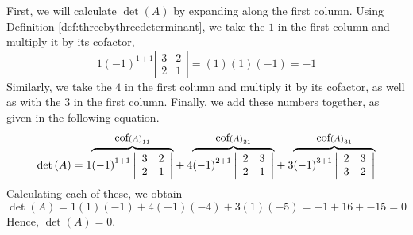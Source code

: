 \begin{solution} First, we will calculate $\det \left(A\right)$ by expanding along the first column.
Using Definition \ref{def:threebythreedeterminant}, we take the $1$ in the first column and multiply it 
by its cofactor,
\begin{equation*}
1  \left( -1\right) ^{1+1}\left|
\begin{array}{rr}
3 & 2 \\
2 & 1
\end{array}
\right| 
=
(1)(1)(-1) = -1 
\end{equation*}
Similarly, we take the $4$ in the first column and multiply it by its cofactor, 
as well as with the $3$ in the first column. Finally, we add these numbers together, as given in the following
equation.
\begin{equation*}
\det \left(A\right) = 
1 \overset{
\mbox{cof}\left( A\right) _{11}}{\overbrace{\left( -1\right) ^{1+1}\left|
\begin{array}{rr}
3 & 2 \\
2 & 1
\end{array}
\right| }}+4 \overset{\mbox{cof}\left( A\right) _{21}}{\overbrace{\left(
-1\right) ^{2+1}\left|
\begin{array}{rr}
2 & 3 \\
2 & 1
\end{array}
\right| }}+3 \overset{\mbox{cof}\left( A\right) _{31}}{\overbrace{\left(
-1\right) ^{3+1}\left|
\begin{array}{rr}
2 & 3 \\
3 & 2
\end{array}
\right| }}
\end{equation*}
Calculating each of these, we obtain
\begin{equation*}
\det \left(A\right)
=
1 \left(1\right)\left(-1\right)
+
4 \left(-1\right)\left(-4\right)
+
3 \left(1\right)\left(-5\right)
=
-1 + 16 + -15
= 
0
\end{equation*}
Hence, $\det\left(A\right) = 0$. 


\end{solution}
